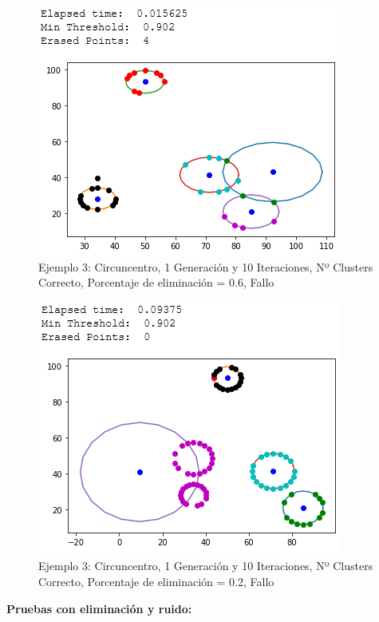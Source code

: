 \documentclass[conference,a4paper]{IEEEtran}
\begin{document}
\begin{figure}[H]
\centering
\includegraphics[scale=0.65]{Experimentacion/Ejemplo3/ej3_c_1_10_me_wrong}
\caption{Ejemplo 3: Circuncentro, 1 Generación y 10 Iteraciones,  Nº Clusters Correcto, Porcentaje de eliminación = 0.6, Fallo\\}
\end{figure}

\begin{figure}[H]
\centering
\includegraphics[scale=0.65]{Experimentacion/Ejemplo3/ej3_c_1_10_le_wrong}
\caption{Ejemplo 3: Circuncentro, 1 Generación y 10 Iteraciones,  Nº Clusters Correcto, Porcentaje de eliminación = 0.2, Fallo\\}
\end{figure}

\newpage
\textbf{Pruebas con eliminación y ruido:}\\
\end{document}
